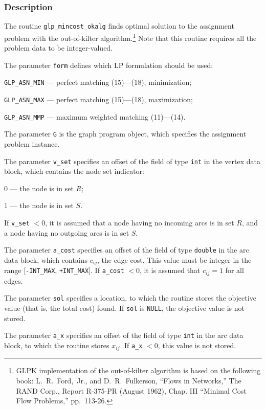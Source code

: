 \subsubsection*{Description}

The routine \verb|glp_mincost_okalg| finds optimal solution to the
assignment problem with the out-of-kilter
algorithm.\footnote{GLPK implementation of the out-of-kilter algorithm
is based on the following book: L.~R.~Ford,~Jr., and D.~R.~Fulkerson,
``Flows in Networks,'' The RAND Corp., Report R-375-PR (August 1962),
Chap. III ``Minimal Cost Flow Problems,'' pp.~113-26.} Note that this
routine requires all the problem data to be integer-valued.

The parameter \verb|form| defines which LP formulation should be used:

\verb|GLP_ASN_MIN| --- perfect matching (15)---(18), minimization;

\verb|GLP_ASN_MAX| --- perfect matching (15)---(18), maximization;

\verb|GLP_ASN_MMP| --- maximum weighted matching (11)---(14).

The parameter \verb|G| is the graph program object, which specifies the
assignment problem instance.

The parameter \verb|v_set| specifies an offset of the field of type
\verb|int| in the vertex data block, which contains the node set
indicator:

0 --- the node is in set $R$;

1 --- the node is in set $S$.

\newpage

\noindent
If \verb|v_set| $<0$, it is assumed that a node having no incoming arcs
is in set $R$, and a node having no outgoing arcs is in set $S$.

The parameter \verb|a_cost| specifies an offset of the field of type
\verb|double| in the arc data block, which contains $c_{ij}$, the edge
cost. This value must be integer in the range [\verb|-INT_MAX|,
\verb|+INT_MAX|]. If \verb|a_cost| $<0$, it is assumed that $c_{ij}=1$
for all edges.

The parameter \verb|sol| specifies a location, to which the routine
stores the objective value (that is, the total cost) found.
If \verb|sol| is \verb|NULL|, the objective value is not stored.

The parameter \verb|a_x| specifies an offset of the field of type
\verb|int| in the arc data block, to which the routine stores $x_{ij}$.
If \verb|a_x| $<0$, this value is not stored.

